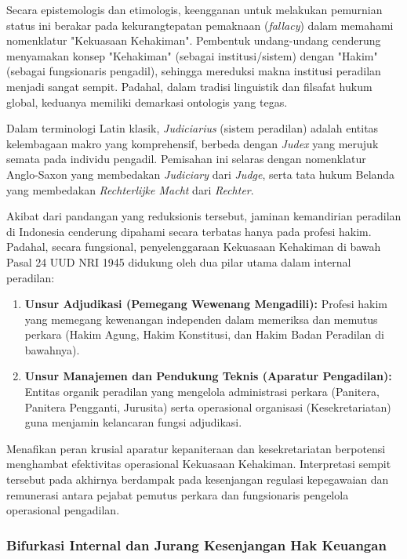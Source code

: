 \documentclass[12pt, a4paper]{article}
\begin{document}
Secara epistemologis dan etimologis, keengganan untuk melakukan pemurnian status ini berakar pada kekurangtepatan pemaknaan (\textit{fallacy}) dalam memahami nomenklatur "Kekuasaan Kehakiman". Pembentuk undang-undang cenderung menyamakan konsep "Kehakiman" (sebagai institusi/sistem) dengan "Hakim" (sebagai fungsionaris pengadil), sehingga mereduksi makna institusi peradilan menjadi sangat sempit. Padahal, dalam tradisi linguistik dan filsafat hukum global, keduanya memiliki demarkasi ontologis yang tegas. 

Dalam terminologi Latin klasik, \textit{Judiciarius} (sistem peradilan) adalah entitas kelembagaan makro yang komprehensif, berbeda dengan \textit{Judex} yang merujuk semata pada individu pengadil. Pemisahan ini selaras dengan nomenklatur Anglo-Saxon yang membedakan \textit{Judiciary} dari \textit{Judge}, serta tata hukum Belanda yang membedakan \textit{Rechterlijke Macht} dari \textit{Rechter}. 

Akibat dari pandangan yang reduksionis tersebut, jaminan kemandirian peradilan di Indonesia cenderung dipahami secara terbatas hanya pada profesi hakim. Padahal, secara fungsional, penyelenggaraan Kekuasaan Kehakiman di bawah Pasal 24 UUD NRI 1945 didukung oleh dua pilar utama dalam internal peradilan:
\begin{enumerate}
    \item \textbf{Unsur Adjudikasi (Pemegang Wewenang Mengadili):} Profesi hakim yang memegang kewenangan independen dalam memeriksa dan memutus perkara (Hakim Agung, Hakim Konstitusi, dan Hakim Badan Peradilan di bawahnya).
    \item \textbf{Unsur Manajemen dan Pendukung Teknis (Aparatur Pengadilan):} Entitas organik peradilan yang mengelola administrasi perkara (Panitera, Panitera Pengganti, Jurusita) serta operasional organisasi (Kesekretariatan) guna menjamin kelancaran fungsi adjudikasi.
\end{enumerate}

Menafikan peran krusial aparatur kepaniteraan dan kesekretariatan berpotensi menghambat efektivitas operasional Kekuasaan Kehakiman. Interpretasi sempit tersebut pada akhirnya berdampak pada kesenjangan regulasi kepegawaian dan remunerasi antara pejabat pemutus perkara dan fungsionaris pengelola operasional pengadilan.

\subsubsection{Bifurkasi Internal dan Jurang Kesenjangan Hak Keuangan}
\end{document}
